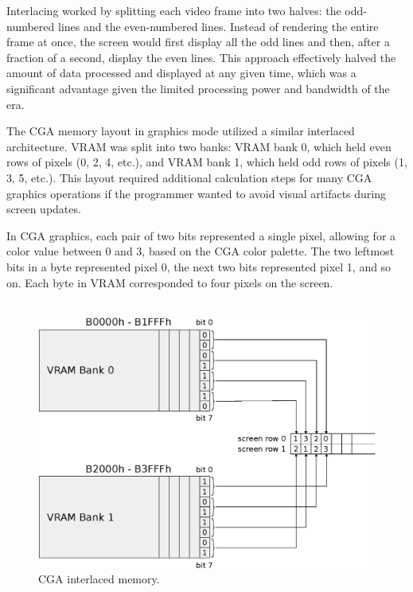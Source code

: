 \documentclass[book.tex]{subfiles}
\begin{document}
\par
Interlacing worked by splitting each video frame into two halves: the odd-numbered lines and the even-numbered lines. Instead of rendering the entire frame at once, the screen would first display all the odd lines and then, after a fraction of a second, display the even lines. This approach effectively halved the amount of data processed and displayed at any given time, which was a significant advantage given the limited processing power and bandwidth of the era.\\

\par
The CGA memory layout in graphics mode utilized a similar interlaced architecture. VRAM was split into two banks: VRAM bank 0, which held even rows of pixels (0, 2, 4, etc.), and VRAM bank 1, which held odd rows of pixels (1, 3, 5, etc.). This layout required additional calculation steps for many CGA graphics operations if the programmer wanted to avoid visual artifacts during screen updates.\\

\par
In CGA graphics, each pair of two bits represented a single pixel, allowing for a color value between 0 and 3, based on the CGA color palette. The two leftmost bits in a byte represented pixel 0, the next two bits represented pixel 1, and so on. Each byte in VRAM corresponded to four pixels on the screen.\\


\\

\begin{figure}[H]
\centering
\includegraphics[width=1.0\textwidth]{imgs/drawings/cga_interlace.eps}
\caption{CGA interlaced memory.}
\label{fig:cga_interlaced}
\end{figure}
\end{document}
